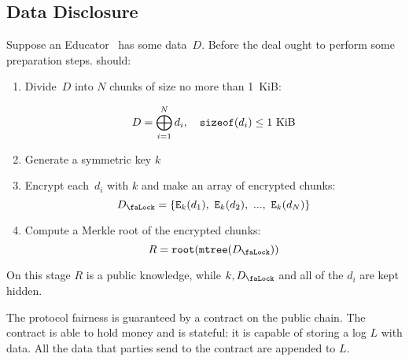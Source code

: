 \subsection{Data Disclosure}
\label{sec:DataDisclosure}

Suppose an Educator~ has some data~$D$. Before the deal  ought to perform some preparation steps.  should:
\begin{enumerate}
\item Divide~$D$ into $N$ chunks of size no more than 1~KiB:

\begin{equation}
D = \bigoplus_{i=1}^N d_i, \quad \mathtt{sizeof}(d_i) \leq 1~\mathrm{KiB}
\end{equation}

\item Generate a symmetric key $k$
\item Encrypt each~$d_i$ with $k$ and make an array of encrypted chunks:
\begin{equation}
\Lock = \{ \Encrypt_\Key{k}(d_1),\ \Encrypt_\Key{k}(d_2),\ ...,\ \Encrypt_\Key{k}(d_N) \}
\end{equation}

\item Compute a Merkle root of the encrypted chunks:
\begin{equation}
R = \Root(\MerkleTree(\Lock))
\end{equation}

\end{enumerate}

On this stage $R$ is a public knowledge, while $k, \Lock$ and all of the $d_i$ are kept hidden.

The protocol fairness is guaranteed by a contract on the public chain. The contract is able to hold money and is stateful: it is capable of storing a log $L$ with data. All the data that parties send to the contract are appended to $L$.

